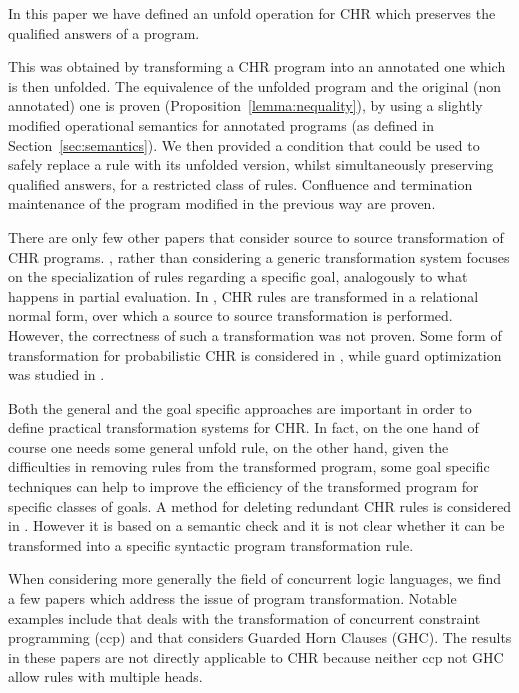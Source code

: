 \documentclass[final]{acmtrans2e}
\begin{document}
In this paper we have defined an unfold operation for CHR which preserves the qualified answers of a program.

This was obtained by transforming a CHR program into an
annotated one which is then unfolded. The equivalence of the unfolded
program and the original (non annotated) one is proven (Proposition~\ref{lemma:nequality}),
by using  a slightly modified operational
semantics for annotated programs (as defined in Section~\ref{sec:semantics}).
We then provided a condition that could be used to safely replace a
rule with its unfolded version, whilst simultaneously preserving qualified answers, for a
restricted class of rules. Confluence and termination maintenance of
the program modified in the previous way are proven.

There are only few other papers that consider source to source transformation
of CHR programs. \cite{Fru04}, rather than considering a generic transformation
system focuses on the specialization of rules regarding a specific goal, analogously
to what happens in partial evaluation. In \cite{FH03}, CHR rules are transformed
in a relational normal form, over which a source to source transformation is performed.
However, the correctness of such a transformation was not proven. Some form of
transformation for probabilistic CHR is considered in \cite{FDPW02}, while
guard optimization was studied in \cite{SSD05b}.

Both the general and the goal specific approaches are important in order
to define practical transformation systems for CHR. In fact, on the
one hand of course one needs some general unfold rule, on the other
hand, given the difficulties in removing rules from the transformed
program, some goal specific techniques can help to improve the
efficiency of the transformed program for specific classes of
goals. A method for deleting redundant CHR rules is considered
in \cite{AF04}. However it is based on a semantic check and it
is not clear whether it can be transformed into a specific syntactic
program transformation rule.

When considering more generally the field of concurrent logic
languages, we find a few papers which address the issue of program
transformation. Notable examples include  \cite{EGM01} that deals with
the transformation of  concurrent constraint programming (ccp) and
\cite{UF88} that considers Guarded Horn Clauses (GHC).  The
results in these papers are not directly applicable to CHR  because
neither ccp not GHC allow rules with  multiple heads.
\end{document}

